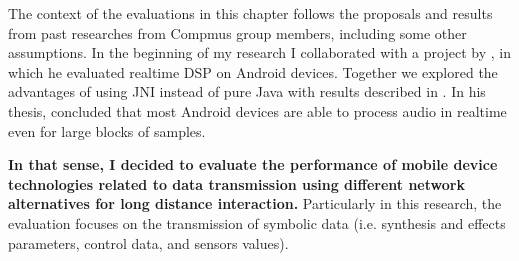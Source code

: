 The context of the evaluations in this chapter follows the proposals and results from past researches from Compmus group members, including some other assumptions.
In the beginning of my research I collaborated with a project by , in which he evaluated realtime DSP on Android devices.
Together we explored the advantages of using JNI instead of pure Java with results described in \citep{deCarvalhoJunior2013fftbenchmark}.
In his thesis,  concluded that most Android devices are able to process audio in realtime even for large blocks of samples.



\textbf{In that sense, I decided to evaluate the performance of mobile device technologies related to data transmission using different network alternatives for long distance interaction.}
Particularly in this research, the evaluation focuses on the transmission of symbolic data (i.e. synthesis and effects parameters, control data, and sensors values).



